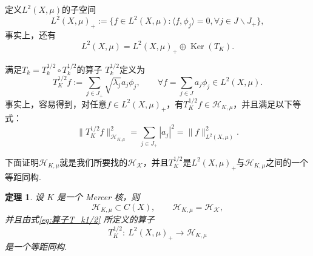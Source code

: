 \documentclass[12pt, a4paper, oneside]{ctexbook}
\newtheorem{theorem}{定理}[section]
\begin{document}
定义$L^2(X,\mu)$的子空间
\begin{equation*}
    L^2(X,\mu)_+:=\{f\in L^2(X,\mu):\langle f,\phi_j\rangle = 0,\forall j\in J\backslash J_+\},
\end{equation*}
事实上，还有
\begin{equation*}
    L^2(X,\mu) = L^2(X,\mu)_+ \oplus \operatorname{Ker}(T_K).
\end{equation*}

满足\(T_k = T_k^{1/2}\circ T_k^{1/2}\)的算子 \(T_k^{1/2}\)定义为
\begin{equation}\label{eq:算子T_k1/2}
    T_K^{1/2}f:=\sum_{j\in J_+}\sqrt{\lambda_j}a_j\phi_j,\qquad \forall f=\sum_{j\in J}a_j\phi_j\in L^2(X,\mu).
\end{equation}
事实上，容易得到，对任意$f\in L^2(X,\mu)_+$，有$T_K^{1/2}f\in \mathcal{H}_{K,\mu}$，并且满足以下等式：
\begin{equation}\label{eq:等距同构}
    \|T_K^{1/2}f\|_{\mathcal{H}_{K,\mu}}^2 = \sum_{j\in J_+}|a_j|^2 = \|f\|^2_{L^2(X,\mu)}.
\end{equation}

下面证明$\mathcal{H}_{K,\mu}$就是我们所要找的$\mathcal{H_K}$，并且$T_K^{1/2}$是$ L^2(X,\mu)_+$与$\mathcal{H}_{K,\mu}$之间的一个等距同构.

\begin{theorem}\label{thm:Mercer-isometry}
设 $K$ 是一个 Mercer 核，则
\[
\mathcal{H}_{K,\mu}\subset C(X), \qquad \mathcal{H}_{K,\mu}=\mathcal {H_K},
\]
并且由式\eqref{eq:算子T_k1/2} 所定义的算子
\[
T_{K}^{1/2}:~L^{2}(X,\mu)_{+}\longrightarrow \mathcal{H}_{K,\mu}
\]
是一个等距同构.
\end{theorem}
\end{document}
